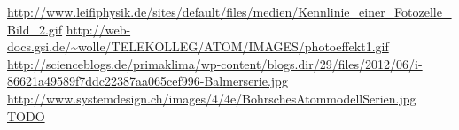 \documentclass[pdftex, a4paper,11pt, twoside, ngerman]{report}
\begin{document}
  
  
  \begin{thebibliography}{99}
    \scriptsize
    \url{http://www.leifiphysik.de/sites/default/files/medien/Kennlinie_einer_Fotozelle_Bild_2.gif}
    \url{http://web-docs.gsi.de/~wolle/TELEKOLLEG/ATOM/IMAGES/photoeffekt1.gif}
    \url{http://scienceblogs.de/primaklima/wp-content/blogs.dir/29/files/2012/06/i-86621a49589f7ddc22387aa065cef996-Balmerserie.jpg}
    \url{http://www.systemdesign.ch/images/4/4e/BohrschesAtommodellSerien.jpg}
     \url{TODO}
    
  \end{thebibliography}
  
\end{document}
